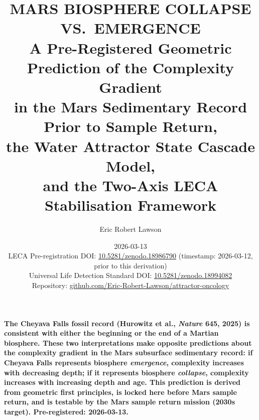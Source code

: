 \documentclass[11pt, a4paper]{article}
\begin{document}
\title{
  \large\bfseries\color{headerblue}
  MARS BIOSPHERE COLLAPSE VS.\ EMERGENCE\\[0.4em]
  \normalsize\color{headerblue}
  A Pre-Registered Geometric Prediction of the
  Complexity Gradient\\
  in the Mars Sedimentary Record Prior to Sample
  Return,\\
  the Water Attractor State Cascade Model,\\
  and the Two-Axis LECA Stabilisation Framework
}

\author[1]{Eric Robert Lawson}

\date{2026-03-13\\[0.3em]
  \footnotesize
  LECA Pre-registration DOI:
  \href{https://doi.org/10.5281/zenodo.18986790}
  {10.5281/zenodo.18986790}
  (timestamp: 2026-03-12,
  prior to this derivation)\\
  Universal Life Detection Standard DOI:
  \href{https://doi.org/10.5281/zenodo.18994082}
  {10.5281/zenodo.18994082}\\
  Repository:
  \href{https://github.com/Eric-Robert-Lawson/attractor-oncology}
  {github.com/Eric-Robert-Lawson/attractor-oncology}
}

\maketitle
\thispagestyle{empty}

\begin{mdframed}[
  backgroundcolor=boxblue,
  linecolor=boxblue,
  linewidth=0pt,
  innertopmargin=0.5em,
  innerbottommargin=0.5em,
  innerleftmargin=1em,
  innerrightmargin=1em
]
\begin{center}
\small\bfseries\color{white}
The Cheyava Falls fossil record (Hurowitz et al.,
\textit{Nature} 645, 2025) is consistent with either
the beginning or the end of a Martian biosphere.
These two interpretations make opposite predictions
about the complexity gradient in the Mars subsurface
sedimentary record: if Cheyava Falls represents
biosphere \textit{emergence}, complexity increases
with decreasing depth; if it represents biosphere
\textit{collapse}, complexity increases with
increasing depth and age.
This prediction is derived from geometric first
principles, is locked here before Mars sample return,
and is testable by the Mars sample return mission
(2030s target).
Pre-registered: 2026-03-13.
\end{center}
\end{mdframed}
\end{document}
